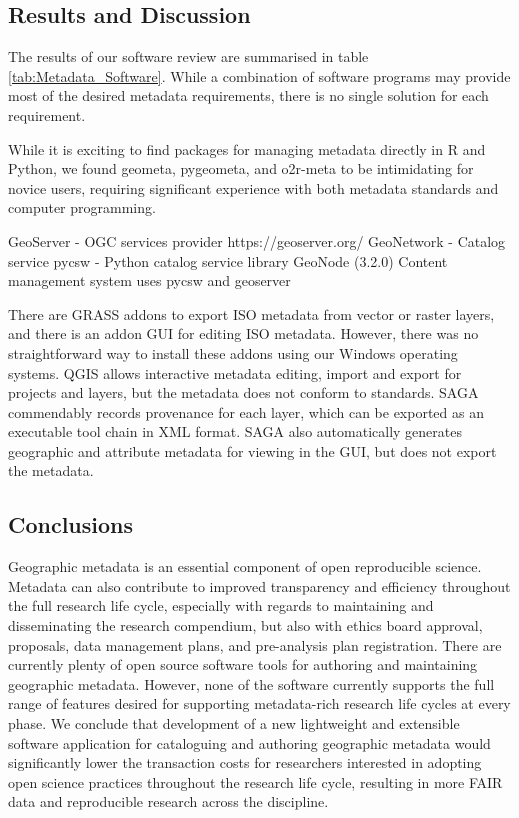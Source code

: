 \documentclass{isprs} %
\begin{document}
\subsection{Results and Discussion}

The results of our software review are summarised in table \ref{tab:Metadata_Software}.
While a combination of software programs may provide most of the desired metadata requirements, there is no single solution for each requirement.

While it is exciting to find packages for managing metadata directly in R and Python, we found geometa, pygeometa, and o2r-meta to be intimidating for novice users, requiring significant experience with both metadata standards and computer programming.

GeoServer - OGC services provider https://geoserver.org/ 
GeoNetwork - Catalog service
pycsw - Python catalog service library
GeoNode (3.2.0) Content management system uses pycsw and geoserver

There are GRASS addons to export ISO metadata from vector or raster layers, and there is an addon GUI for editing ISO metadata. However, there was no straightforward way to install these addons using our Windows operating systems.
QGIS allows interactive metadata editing, import and export for projects and layers, but the metadata does not conform to standards.
SAGA commendably records provenance for each layer, which can be exported as an executable tool chain in XML format. SAGA also automatically generates geographic and attribute metadata for viewing in the GUI, but does not export the metadata.

\subsection{Conclusions}

Geographic metadata is an essential component of open reproducible science.
Metadata can also contribute to improved transparency and efficiency throughout the full research life cycle, especially with regards to maintaining and disseminating the research compendium, but also with ethics board approval, proposals, data management plans, and pre-analysis plan registration. 
There are currently plenty of open source software tools for authoring and maintaining geographic metadata.
However, none of the software currently supports the full range of features desired for supporting metadata-rich research life cycles at every phase.
We conclude that development of a new lightweight and extensible software application for cataloguing and authoring geographic metadata would significantly lower the transaction costs for researchers interested in adopting open science practices throughout the research life cycle, resulting in more FAIR data and reproducible research across the discipline. 
\end{document}
